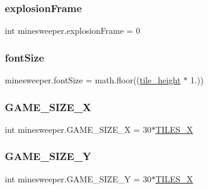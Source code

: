 \subsubsection{\texorpdfstring{explosionFrame}{explosionFrame}}
{\footnotesize\ttfamily int minesweeper.\+explosion\+Frame = 0}

\mbox{\label{namespaceminesweeper_a8d7e0edcef8465377296847bc7110ada}} 
\subsubsection{\texorpdfstring{fontSize}{fontSize}}
{\footnotesize\ttfamily minesweeper.\+font\+Size = math.\+floor((\mbox{\hyperlink{namespaceminesweeper_a033197bb6aa4149287e9c4fcdeff7d96}{tile\+\_\+height}} $\ast$ 1.))}

\mbox{\label{namespaceminesweeper_a46d8139d06a5719868fc00cba651c8ff}} 
\subsubsection{\texorpdfstring{GAME\_SIZE\_X}{GAME\_SIZE\_X}}
{\footnotesize\ttfamily int minesweeper.\+G\+A\+M\+E\+\_\+\+S\+I\+Z\+E\+\_\+X = 30$\ast$\mbox{\hyperlink{namespaceminesweeper_ac9707e38bc10ae8def8674e284754df2}{T\+I\+L\+E\+S\+\_\+X}}}

\mbox{\label{namespaceminesweeper_a9a2cdb7107890f2ec70e23210fe06775}} 
\subsubsection{\texorpdfstring{GAME\_SIZE\_Y}{GAME\_SIZE\_Y}}
{\footnotesize\ttfamily int minesweeper.\+G\+A\+M\+E\+\_\+\+S\+I\+Z\+E\+\_\+Y = 30$\ast$\mbox{\hyperlink{namespaceminesweeper_ac9707e38bc10ae8def8674e284754df2}{T\+I\+L\+E\+S\+\_\+X}}}

\mbox{\label{namespaceminesweeper_a2ba68d97d759f1a1f48f1ec7ff395775}} 
